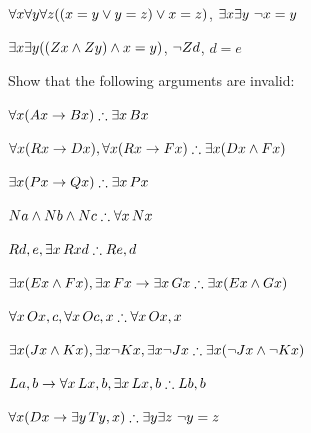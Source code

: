 \begin{practiceproblems}
\begin{problemslist}
		\item $\forall x\forall y\forall z((x=y \vee y=z )\vee x=z)$, $\exists x\exists y\ \neg x= y$
		
		\item $\exists x\exists y((\mathord{Z}x \mathbin{\wedge} \mathord{Z}y )\mathbin{\wedge} x=y)$, $\neg \mathord{Z}d$, $d=e$
	\end{problemslist}
	
	\problempart
	Show that the following arguments are invalid:
	\begin{problemslist}
		\item $\forall x(\atom{A}{x} \eif \atom{B}{x}) \therefore \exists x\,\atom{B}{x}$
		\item $\forall x(\atom{R}{x} \eif \atom{D}{x}), \forall x(\atom{R}{x} \eif \atom{F}{x}) \therefore \exists x(\atom{D}{x} \eand \atom{F}{x})$
		\item $\exists x(\atom{P}{x}\eif \atom{Q}{x}) \therefore \exists x\,\atom{P}{x}$
		\item $\atom{N}{a} \eand \atom{N}{b} \eand \atom{N}{c} \therefore \forall x\,\atom{N}{x}$
		\item $\atom{R}{d,e}, \exists x\,\atom{R}{xd} \therefore \atom{R}{e,d}$
		\item $\exists x(\atom{E}{x} \eand \atom{F}{x}), \exists x\,\atom{F}{x} \eif \exists x\,\atom{G}{x} \therefore \exists x(\atom{E}{x} \eand \atom{G}{x})$
		\item $\forall x\,\atom{O}{x,c}, \forall x\,\atom{O}{c,x} \therefore \forall x\,\atom{O}{x,x}$
		\item $\exists x(\atom{J}{x} \eand \atom{K}{x}), \exists x \enot \atom{K}{x}, \exists x \enot \atom{J}{x} \therefore \exists x(\enot \atom{J}{x} \eand \enot \atom{K}{x})$
		\item $\atom{L}{a,b} \eif \forall x\,\atom{L}{x,b}, \exists x\,\atom{L}{x,b} \therefore \atom{L}{b,b}$
		\item $\forall x(\atom{D}{x} \eif \exists y\,\atom{T}{y,x}) \therefore \exists y \exists z\ \enot y= z$
	\end{problemslist}
	
	
\end{practiceproblems}
